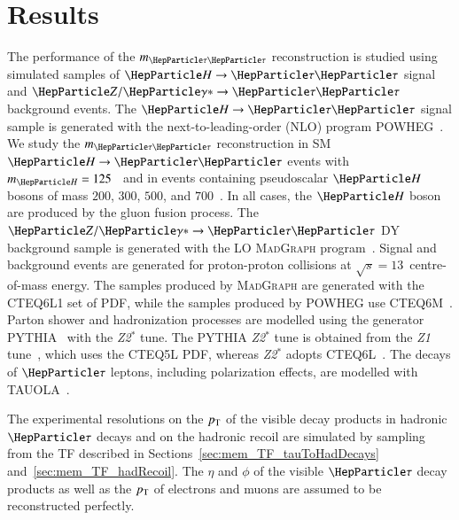 \section{Results}
\label{sec:results}

The performance of the $m_{\Pgt\Pgt}$ reconstruction is studied using
simulated samples of $\PHiggs \to \Pgt\Pgt$ signal and $\PZ/\Pggx \to
\Pgt\Pgt$ background events.
The $\PHiggs \to \Pgt\Pgt$ signal sample is generated with the next-to-leading-order (NLO) program \textsc{POWHEG}~\cite{POWHEG1,POWHEG2,POWHEG3}.
We study the $m_{\Pgt\Pgt}$ reconstruction in SM $\PHiggs \to \Pgt\Pgt$ events with $m_{\PHiggs} = 125$~\GeV
and in events containing pseudoscalar $\PHiggs$ bosons of mass $200$, $300$, $500$, and $700$~\GeV.
In all cases, the $\PHiggs$ boson are produced by the gluon fusion process.
The $\PZ/\Pggx \to \Pgt\Pgt$ DY background sample is generated with the LO \textsc{MadGraph} program~\cite{MadGraph}.
Signal and background events are generated for proton-proton collisions at $\sqrt{s} = 13$~\TeV centre-of-mass energy.
The samples produced by \textsc{MadGraph} are generated with the \textsc{CTEQ6L1} set of PDF,
while the samples produced by \textsc{POWHEG} use \textsc{CTEQ6M}~\cite{CTEQ6}.
Parton shower and hadronization processes are modelled using the generator \textsc{PYTHIA}~\cite{pythia8} with the \emph{Z2$^{*}$} tune.
The \textsc{PYTHIA} \emph{Z2$^{*}$} tune is obtained from the \emph{Z1} tune~\cite{PYTHIA_Z1tune_CMS},
which uses the \textsc{CTEQ5L} PDF, 
whereas \emph{Z2$^{*}$} adopts \textsc{CTEQ6L}~\cite{CTEQ6}.
The decays of $\Pgt$ leptons, including polarization effects, are modelled with \textsc{TAUOLA}~\cite{tauola}.

The experimental resolutions on the $p_{\textrm{T}}$ of the visible decay products in hadronic $\Pgt$ decays
and on the hadronic recoil are simulated by sampling from the TF described in Sections~\ref{sec:mem_TF_tauToHadDecays} and~\ref{sec:mem_TF_hadRecoil}.
The $\eta$ and $\phi$ of the visible $\Pgt$ decay products as well as the $p_{\textrm{T}}$ of electrons and muons are assumed to be reconstructed perfectly.

